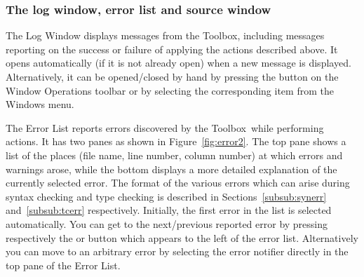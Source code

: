 \documentclass[\pformat,12pt]{article}
\newcommand{\Toolbox}{Toolbox}
\newcommand{\guicmd}[1]{{\sf #1}}
\begin{document}
\subsubsection{The log window, error list and source window}

The \guicmd{Log Window} displays messages from the \Toolbox, including
messages reporting on the success or failure of applying the actions
described above. It opens automatically (if it is not already open)
when a new message is displayed. Alternatively, it can be
opened/closed by hand by pressing the 
button on the \guicmd{Window Operations} toolbar or by
selecting the corresponding item from the \guicmd{Windows} menu.


The \guicmd{Error List} reports errors discovered by the \Toolbox\
while performing actions. It has two panes as shown in
Figure~\ref{fig:error2}. The top pane shows a list of the places (file
name, line number, column number) at which errors and warnings arose,
while the bottom displays a more detailed explanation of the currently
selected error. The format of the various errors which can arise
  during syntax checking and type checking is described in
  Sections~\ref{subsub:synerr} and~\ref{subsub:tcerr} respectively.  
Initially, the first error in the list is selected
automatically. You can get to the next/previous reported error by
pressing respectively the {\fbox{\tt >}} or \fbox{{\tt <}} button
which appears to the left of the error list. Alternatively you can
move to an arbitrary error by selecting the error notifier directly in
the top pane of the \guicmd{Error List}.
\end{document}
